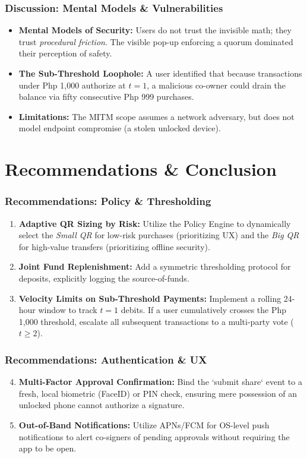 \documentclass{beamer}
\begin{document}
\begin{frame}
  \frametitle{Discussion: Mental Models \& Vulnerabilities}
  \begin{itemize}
      \item \textbf{Mental Models of Security:} Users do not trust the invisible math; they trust \textit{procedural friction}. The visible pop-up enforcing a quorum dominated their perception of safety.
      \item \textbf{The Sub-Threshold Loophole:} A user identified that because transactions under Php 1,000 authorize at $t=1$, a malicious co-owner could drain the balance via fifty consecutive Php 999 purchases.
      \item \textbf{Limitations:} The MITM scope assumes a network adversary, but does not model endpoint compromise (a stolen unlocked device).
  \end{itemize}
\end{frame}

\section{Recommendations \& Conclusion}
\begin{frame}
  \frametitle{Recommendations: Policy \& Thresholding}
  \begin{enumerate}
      \item \textbf{Adaptive QR Sizing by Risk:} Utilize the Policy Engine to dynamically select the \textit{Small QR} for low-risk purchases (prioritizing UX) and the \textit{Big QR} for high-value transfers (prioritizing offline security).
      \item \textbf{Joint Fund Replenishment:} Add a symmetric thresholding protocol for deposits, explicitly logging the source-of-funds.
      \item \textbf{Velocity Limits on Sub-Threshold Payments:} Implement a rolling 24-hour window to track $t=1$ debits. If a user cumulatively crosses the Php 1,000 threshold, escalate all subsequent transactions to a multi-party vote ($t \ge 2$).
  \end{enumerate}
\end{frame}

\begin{frame}
  \frametitle{Recommendations: Authentication \& UX}
  \begin{enumerate}
      \setcounter{enumi}{3}
      \item \textbf{Multi-Factor Approval Confirmation:} Bind the `submit share` event to a fresh, local biometric (FaceID) or PIN check, ensuring mere possession of an unlocked phone cannot authorize a signature.
      \item \textbf{Out-of-Band Notifications:} Utilize APNs/FCM for OS-level push notifications to alert co-signers of pending approvals without requiring the app to be open.
  \end{enumerate}
\end{frame}
\end{document}
